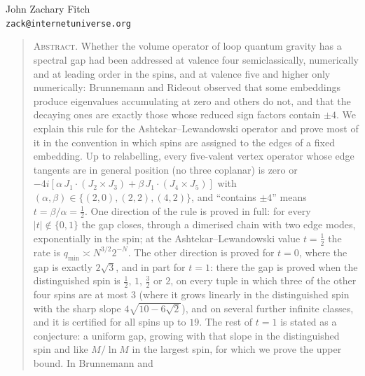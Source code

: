 \documentclass[12pt,letterpaper]{article}
\theoremstyle{esmath-tier3}
\newcommand{\qm}{q_{\min}}
\begin{document}
\begin{center}
\\[4pt]
\\[10pt]
{\normalsize John Zachary Fitch}\\[1pt]
{\small\texttt{zack@internetuniverse.org}}
\end{center}

\esrule

\begin{quote}\small
\textsc{Abstract.} Whether the volume operator of loop quantum gravity has a
spectral gap had been addressed at valence four semiclassically, numerically and at
leading order in the spins, and at valence five and higher only numerically:
Brunnemann and Rideout observed that some embeddings produce eigenvalues accumulating
at zero and others do not, and that the decaying ones are exactly those whose reduced
sign factors contain $\pm4$. We explain this rule for the Ashtekar--Lewandowski
operator and prove most of it in the convention in which spins are assigned to the
edges of a fixed embedding. Up to relabelling, every five-valent vertex operator whose
edge tangents are in general position (no three coplanar) is zero or $-4i[\alpha\,J_1\cdot(J_2\times J_3)+\beta\,J_1\cdot(J_4\times
J_5)]$ with $(\alpha,\beta)\in\{(2,0),(2,2),(4,2)\}$, and ``contains $\pm4$'' means
$t=\beta/\alpha=\frac12$. One direction of the rule is proved in full: for every
$|t|\notin\{0,1\}$ the gap closes, through a dimerised chain with two edge modes,
exponentially in the spin; at the Ashtekar--Lewandowski value $t=\frac12$ the rate is
$\qm\asymp N^{3/2}2^{-N}$. The other direction is proved for $t=0$, where the gap is
exactly $2\sqrt3$, and in part for $t=1$: there the gap is proved when the
distinguished spin is $\frac12$, $1$, $\frac32$ or $2$, on every tuple in which three
of the other four spins are at most $3$ (where it grows linearly in the distinguished
spin with the sharp slope $4\sqrt{10-6\sqrt2}$), and on several further infinite classes,
and it is certified for all spins up to $19$. The rest of $t=1$ is stated as a
conjecture: a uniform gap, growing with that slope in the distinguished spin and like
$M/\ln M$ in the largest spin, for which we prove the upper bound. In Brunnemann and

\end{quote}
\end{document}
